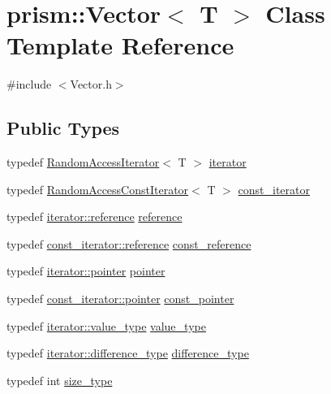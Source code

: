\hypertarget{classprism_1_1_vector}{}\section{prism\+:\+:Vector$<$ T $>$ Class Template Reference}
\label{classprism_1_1_vector}


{\ttfamily \#include $<$Vector.\+h$>$}

\subsection*{Public Types}
\begin{DoxyCompactItemize}
\item 
typedef \hyperlink{classprism_1_1_random_access_iterator}{Random\+Access\+Iterator}$<$ T $>$ \hyperlink{classprism_1_1_vector_aa547779173a63f6f8c9b2887498d10eb}{iterator}
\item 
typedef \hyperlink{classprism_1_1_random_access_const_iterator}{Random\+Access\+Const\+Iterator}$<$ T $>$ \hyperlink{classprism_1_1_vector_acc6ed07e2d7ed5065feec92a83e46fa4}{const\+\_\+iterator}
\item 
typedef \hyperlink{classprism_1_1_forward_iterator_a4f7bff2c238f447c1537c74fe09f8935}{iterator\+::reference} \hyperlink{classprism_1_1_vector_a8ccf98342707efbed82918a44be97438}{reference}
\item 
typedef \hyperlink{classprism_1_1_forward_const_iterator_a839eeb121503b031260ad21ef844dd9a}{const\+\_\+iterator\+::reference} \hyperlink{classprism_1_1_vector_a75325487acaa0f63496c110e5a5632bb}{const\+\_\+reference}
\item 
typedef \hyperlink{classprism_1_1_forward_iterator_af50dd6e13f3cea3ee3b2332e48996502}{iterator\+::pointer} \hyperlink{classprism_1_1_vector_a9823d64f361cdff3fcc5043e8b4bd882}{pointer}
\item 
typedef \hyperlink{classprism_1_1_forward_const_iterator_a6e4e245d3ab99d6e9b237abe2c0c06d8}{const\+\_\+iterator\+::pointer} \hyperlink{classprism_1_1_vector_a0bf16322f83f0ad9103815a1cac16156}{const\+\_\+pointer}
\item 
typedef \hyperlink{classprism_1_1_forward_iterator_a7a28958d2cf2ea2613c6f0f011759781}{iterator\+::value\+\_\+type} \hyperlink{classprism_1_1_vector_a12f8585af6daa44e7732880b3f725ee3}{value\+\_\+type}
\item 
typedef \hyperlink{classprism_1_1_forward_iterator_a8c90486e85c02351c2e957ba3247ab10}{iterator\+::difference\+\_\+type} \hyperlink{classprism_1_1_vector_a5fe3b74bfb30d75aa74d4d896e6b7227}{difference\+\_\+type}
\item 
typedef int \hyperlink{classprism_1_1_vector_a14c909f500f13b8b7a276bb97ae746e8}{size\+\_\+type}
\end{DoxyCompactItemize}
